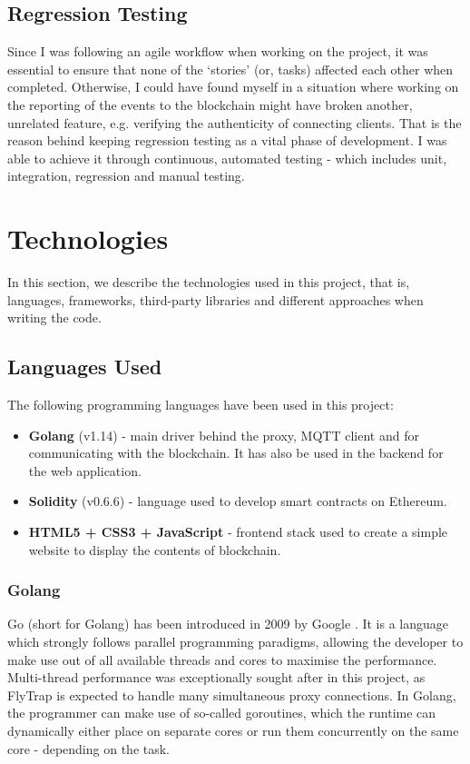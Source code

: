 \subsection{Regression Testing}

Since I was following an agile workflow when working on the project, it was essential to ensure that none of the `stories' (or, tasks) affected each other when completed. Otherwise, I could have found myself in a situation where working on the reporting of the events to the blockchain might have broken another, unrelated feature, e.g. verifying the authenticity of connecting clients. That is the reason behind keeping regression testing as a vital phase of development. I was able to achieve it through continuous, automated testing - which includes unit, integration, regression and manual testing.

\section{Technologies}

In this section, we describe the technologies used in this project, that is, languages, frameworks, third-party libraries and different approaches when writing the code.

\subsection{Languages Used}

The following programming languages have been used in this project:
\begin{itemize}
 \item \textbf{Golang} (v1.14) - main driver behind the proxy, MQTT client and for communicating with the blockchain. It has also be used in the backend for the web application.
 \item \textbf{Solidity} (v0.6.6) - language used to develop smart contracts on Ethereum.
 \item \textbf{HTML5 + CSS3 + JavaScript} - frontend stack used to create a simple website to display the contents of blockchain.
\end{itemize}

\subsubsection{Golang}
Go (short for Golang) has been introduced in 2009 by Google \cite{team2009go}. It is a language which strongly follows parallel programming paradigms, allowing the developer to make use out of all available threads and cores to maximise the performance. Multi-thread performance was exceptionally sought after in this project, as FlyTrap is expected to handle many simultaneous proxy connections. In Golang, the programmer can make use of so-called goroutines, which the runtime can dynamically either place on separate cores or run them concurrently on the same core - depending on the task.

